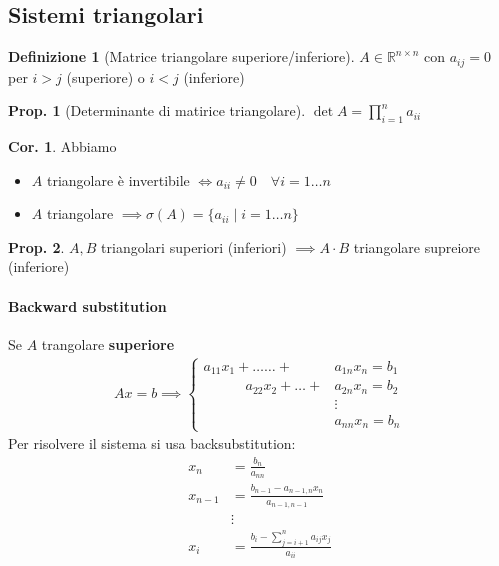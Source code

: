 \documentclass[a4paper,10pt]{article}
\theoremstyle{definition}
\newcommand{\re}{\mathbb{R}} %
\theoremstyle{indentdefinition}
\newtheorem{defn}{Definizione}[section]
\theoremstyle{indenttheorem}
\newtheorem{prop}{Prop.}
\newtheorem{cor}{Cor.}
\theoremstyle{myremark}
\theoremstyle{indentgeneral}
\theoremstyle{plain}
\theoremstyle{plain}
\begin{document}
\subsection{Sistemi triangolari}

\begin{defn}[Matrice triangolare superiore/inferiore]
    $A\in \re^{n\times n}$ con $a_{ij}=0$ per $i>j$ (superiore) o  $i<j$ (inferiore) 
\end{defn}

\begin{prop}[Determinante di matirice triangolare] $\det A=\prod_{i=1}^na_{ii}$
    
\end{prop}
\begin{cor} Abbiamo
\begin{itemize}
    \item   $A$ triangolare è invertibile $\iff a_{ii}\ne0\quad\forall i=1\dots n$
    \item   $A$ triangolare $\implies \sigma(A)=\{a_{ii}\mid i=1\dots n\}$
\end{itemize}
\end{cor}

\begin{prop}
    $A,B$ triangolari superiori (inferiori) $\implies A\cdot B$ triangolare supreiore (inferiore)
\end{prop}

\paragraph{Backward substitution} Se  $A$ trangolare \textbf{superiore}
\begin{align*}
    Ax=b\implies \begin{cases}
        a_{11}x_1+  \dots \dots+ & a_{1n}x_n  =b_1 \\
       \qquad\quad  a_{22}x_2+ \dots+  & a_{2n}x_n  =b_2 \\
           & \vdots \\
         & a_{nn}x_n =b_n
    \end{cases}
\end{align*}
Per risolvere il sistema si usa backsubstitution:
\begin{align*}
    x_n&=\frac{b_n}{a_{nn}}\\
    x_{n-1}&=\frac{b_{n-1}-a_{n-1,n}x_n}{a_{n-1,n-1}} \\
    &\vdots \\
    x_i&=\frac{b_i-\sum_{j=i+1}^na_{ij}x_j}{a_{ii}}
\end{align*}
\end{document}
